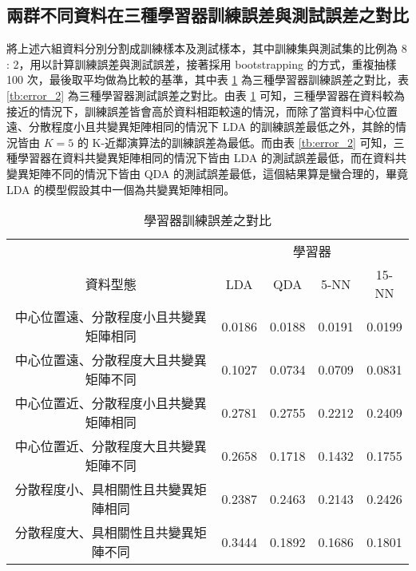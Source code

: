\subsection{兩群不同資料在三種學習器訓練誤差與測試誤差之對比}
將上述六組資料分別分割成訓練樣本及測試樣本，其中訓練集與測試集的比例為 8 : 2，用以計算訓練誤差與測試誤差，接著採用 bootstrapping 的方式，重複抽樣 100 次，最後取平均做為比較的基準，其中表 \ref{tb:error_1} 為三種學習器訓練誤差之對比，表 \ref{tb:error_2} 為三種學習器測試誤差之對比。由表 \ref{tb:error_1} 可知，三種學習器在資料較為接近的情況下，訓練誤差皆會高於資料相距較遠的情況，而除了當資料中心位置遠、分散程度小且共變異矩陣相同的情況下 LDA 的訓練誤差最低之外，其餘的情況皆由 $K = 5$ 的 K-近鄰演算法的訓練誤差為最低。而由表 \ref{tb:error_2} 可知，三種學習器在資料共變異矩陣相同的情況下皆由 LDA 的測試誤差最低，而在資料共變異矩陣不同的情況下皆由 QDA 的測試誤差最低，這個結果算是蠻合理的，畢竟 LDA 的模型假設其中一個為共變異矩陣相同。
\bigskip
\begin{table}[H] 
\centering
\caption{學習器訓練誤差之對比}\label{tb:error_1}
\tabcolsep=12pt
\begin{tabular}{ccccc} 
\toprule
& \multicolumn{4}{c}{學習器}\\
\cmidrule(l){2-5}
資料型態 & LDA & QDA & 5-NN & 15-NN\\[3pt]
\midrule
中心位置遠、分散程度小且共變異矩陣相同 & \cellcolor{red!25}0.0186 & 0.0188  & 0.0191 & 0.0199 \\[3pt]
中心位置遠、分散程度大且共變異矩陣不同 & 0.1027 & 0.0734 & \cellcolor{red!25}0.0709 & 0.0831 \\[3pt]
中心位置近、分散程度小且共變異矩陣相同 & 0.2781 & 0.2755 & \cellcolor{red!25}0.2212 & 0.2409 \\[3pt]
中心位置近、分散程度大且共變異矩陣不同 & 0.2658 & 0.1718 & \cellcolor{red!25}0.1432 & 0.1755 \\ [3pt]
分散程度小、具相關性且共變異矩陣相同 & 0.2387 &  0.2463 & \cellcolor{red!25}0.2143 & 0.2426 \\ [3pt]
分散程度大、具相關性且共變異矩陣不同 & 0.3444 &  0.1892 & \cellcolor{red!25}0.1686 & 0.1801 \\ 
\bottomrule
\end{tabular}
\end{table}\bigskip
